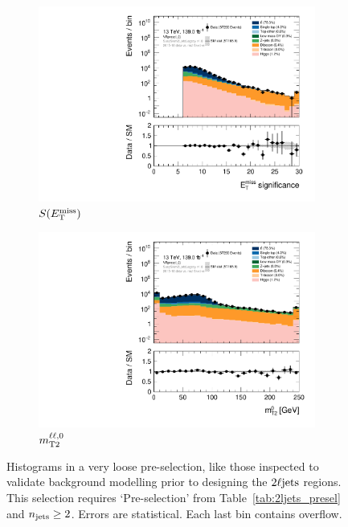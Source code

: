 \begin{figure}[tp]
\centering
\begin{subfigure}{0.48\textwidth}
\centering
\includegraphics[width=\textwidth]{figures/2ljets_prepre_met_Sign_VRpresel_2j_MCfakeslogY.pdf}
\caption{$S(E_\mathrm{T}^\mathrm{miss})$}
\end{subfigure}
\hfill
\begin{subfigure}{0.48\textwidth}
\centering
\includegraphics[width=\textwidth]{figures/2ljets_prepre_mt2leplsp_0_VRpresel_2j_MCfakeslogY.pdf}
\caption{$m_\mathrm{T2}^{\ell\ell,0}$}
\end{subfigure}
\caption[
Histograms in a very loose pre-selection
]{%
Histograms in a very loose pre-selection, like those inspected to validate
background modelling prior to designing the $2\ell\mathrm{jets}$ regions.
This selection requires `Pre-selection' from Table~\ref{tab:2ljets_presel} and
$n_\mathrm{jets} \geq 2$.
Errors are statistical.
Each last bin contains overflow.
}
\label{fig:2ljets_prepre}
\end{figure}

